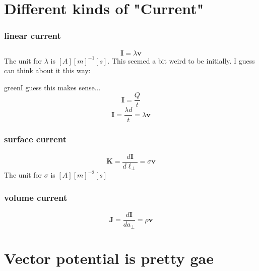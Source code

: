 \section{Different kinds of "Current"}
\subsubsection{linear current}
\begin{equation}
    \mathbf{I}=\lambda \mathbf{v}
\end{equation}
The unit for $\lambda$ is $[A][m]^{-1}[s]$.
This seemed a bit weird to be initially. I guess can think about it this way:
\begin{mybox}{green}{I guess this makes sense...}
    \begin{equation}
        \mathbf{I}=\frac{Q}{t}
    \end{equation}
    \begin{equation}
        \mathbf{I}=\frac{\lambda d}{t}=\lambda \mathbf{v}
    \end{equation}
\end{mybox}
\subsubsection{surface current}
\begin{equation}
    \mathbf{K}=\frac{d\mathbf{I}}{d\ell_\perp}=\sigma \mathbf{v}
\end{equation}
The unit for $\sigma$ is $[A][m]^{-2}[s]$
\subsubsection{volume current}
\begin{equation}
    \mathbf{J}=\frac{d\mathbf{I}}{da_\perp}=\rho \mathbf{v}
\end{equation}
\section{Vector potential is pretty gae}

